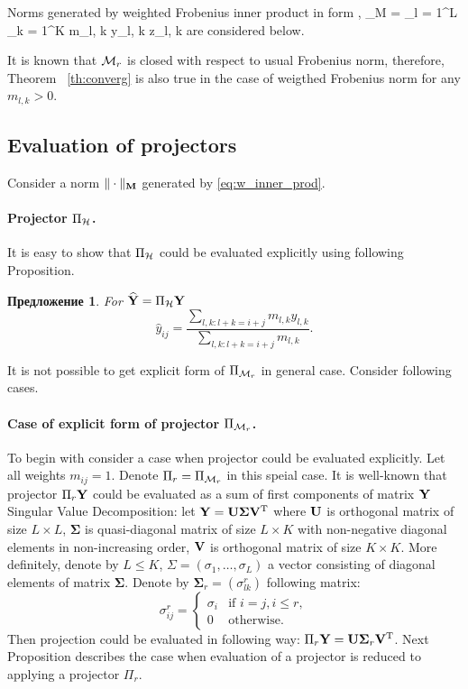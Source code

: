 \documentclass[12pt,a4paper,fleqn,leqno]{article}
\newtheorem{proposition}{Предложение}
\begin{document}
Norms generated by weighted Frobenius inner product in form
\be
\label{eq:w_inner_prod}
\langle\bfY, \bfZ\rangle_M = \sum_{l = 1}^L \sum_{k = 1}^K m_{l, k} y_{l, k} z_{l, k}
\ee
are considered below.

It is known that $\mathcal{M}_r$ is closed with respect to usual Frobenius norm, therefore, Theorem ~\ref{th:converg} is also true in the case of weigthed Frobenius norm for any $m_{l,k} > 0$.


\subsection{Evaluation of projectors}

Consider a norm $\|\cdot\|_{\mathbf{M}}$ generated by \eqref{eq:w_inner_prod}.

\paragraph{Projector $\Pi_{\mathcal{H}}$.} It is easy to show that $\Pi_{\mathcal{H}}$
could be evaluated explicitly using following Proposition.

\begin{proposition}
For $\widehat{\mathbf{Y}}=\Pi_{\mathcal{H}} \mathbf{Y}$
\begin{equation*}
\hat{y}_{ij} = \frac{\sum_{l,k: l+k=i+j} m_{l,k} y_{l,k}}{\sum_{l,k: l+k=i+j} m_{l,k}}.
\end{equation*}
\end{proposition}

It is not possible to get explicit form of $\Pi_{\mathcal{M}_r}$ in general case.
Consider following cases.

\paragraph{Case of explicit form of projector $\Pi_{\mathcal{M}_r}$.} To begin with consider a case when projector could be evaluated explicitly.
Let all weights $m_{ij}=1$. Denote $\Pi_r=\Pi_{\mathcal{M}_r}$ in this speial case.
It is well-known that projector $\Pi_{r} \mathbf{Y}$ could be evaluated as a sum of first components of matrix $\mathbf{Y}$ Singular Value Decomposition: let $\mathbf{Y} = \mathbf{U} \mathbf{\Sigma} \mathbf{V}^{\mathrm{T}}$ where $\mathbf{U}$ is orthogonal matrix of size $L \times L$, $\mathbf{\Sigma}$ is quasi-diagonal matrix of size $L \times K$ with non-negative diagonal elements in non-increasing order, $\mathbf{V}$ is orthogonal matrix of size $K \times K$. More definitely, denote by $L\le K$, $\Sigma = (\sigma_1, \ldots, \sigma_L)$ a vector consisting of diagonal elements of matrix $\mathbf{\Sigma}$. Denote by $\mathbf{\Sigma}_r = (\sigma^r_{l k})$ following matrix:
\begin{equation*}
\sigma^r_{i j} = \begin{cases}
\sigma_i & \text{if $i = j, i \le r,$}\\
0 & \text{otherwise}.
\end{cases}
\end{equation*}
Then projection could be evaluated in following way: $\Pi_{r} \mathbf{Y}  = \mathbf{U} \mathbf{\Sigma}_r \mathbf{V}^{\mathrm{T}}$.
Next Proposition describes the case when evaluation of a projector is reduced to applying a projector  $\Pi_r$.
\end{document}
